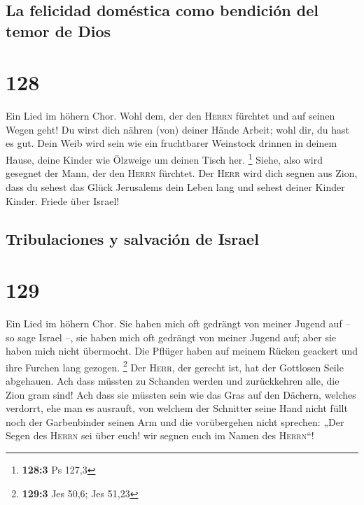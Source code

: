 \hypertarget{la-felicidad-domuxe9stica-como-bendiciuxf3n-del-temor-de-dios}{%
\subsection{La felicidad doméstica como bendición del temor de
Dios}\label{la-felicidad-domuxe9stica-como-bendiciuxf3n-del-temor-de-dios}}

\hypertarget{section-127}{%
\section{128}\label{section-127}}

 Ein Lied im höhern Chor. Wohl dem, der den \textsc{Herrn}
fürchtet und auf seinen Wegen geht!  Du wirst dich nähren
(von) deiner Hände Arbeit; wohl dir, du hast es gut.  Dein
Weib wird sein wie ein fruchtbarer Weinstock drinnen in deinem Hause,
deine Kinder wie Ölzweige um deinen Tisch her. \footnote{\textbf{128:3}
  Ps 127,3}  Siehe, also wird gesegnet der Mann, der den
\textsc{Herrn} fürchtet.  Der \textsc{Herr} wird dich
segnen aus Zion, dass du sehest das Glück Jerusalems dein Leben lang
 und sehest deiner Kinder Kinder. Friede über Israel!

\hypertarget{tribulaciones-y-salvaciuxf3n-de-israel}{%
\subsection{Tribulaciones y salvación de
Israel}\label{tribulaciones-y-salvaciuxf3n-de-israel}}

\hypertarget{section-128}{%
\section{129}\label{section-128}}

 Ein Lied im höhern Chor. Sie haben mich oft gedrängt von
meiner Jugend auf -- so sage Israel --,  sie haben mich
oft gedrängt von meiner Jugend auf; aber sie haben mich nicht übermocht.
 Die Pflüger haben auf meinem Rücken geackert und ihre
Furchen lang gezogen. \footnote{\textbf{129:3} Jes 50,6; Jes 51,23}
 Der \textsc{Herr}, der gerecht ist, hat der Gottlosen
Seile abgehauen.  Ach dass müssten zu Schanden werden und
zurückkehren alle, die Zion gram sind!  Ach dass sie
müssten sein wie das Gras auf den Dächern, welches verdorrt, ehe man es
ausrauft,  von welchem der Schnitter seine Hand nicht
füllt noch der Garbenbinder seinen Arm  und die
vorübergehen nicht sprechen: „Der Segen des \textsc{Herrn} sei über
euch! wir segnen euch im Namen des \textsc{Herrn}``!

